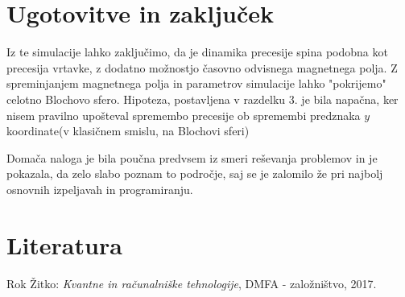 \documentclass[12pt, a4paper]{article}
\begin{document}
\section{Ugotovitve in zaključek}
Iz te simulacije lahko zaključimo, da je dinamika precesije spina podobna kot precesija vrtavke, z dodatno možnostjo časovno odvisnega magnetnega polja. Z spreminjanjem magnetnega polja in parametrov simulacije lahko "pokrijemo" celotno Blochovo sfero. Hipoteza, postavljena v razdelku 3. je bila napačna, ker nisem pravilno upošteval spremembo precesije ob spremembi predznaka $y$ koordinate(v klasičnem smislu, na Blochovi sferi)

Domača naloga je bila poučna predvsem iz smeri reševanja problemov in je pokazala, da zelo slabo poznam to področje, saj se je zalomilo že pri najbolj osnovnih izpeljavah in programiranju.

\section{Literatura}
Rok Žitko: \textit{Kvantne in računalniške tehnologije}, DMFA - založništvo, 2017.
\end{document}
